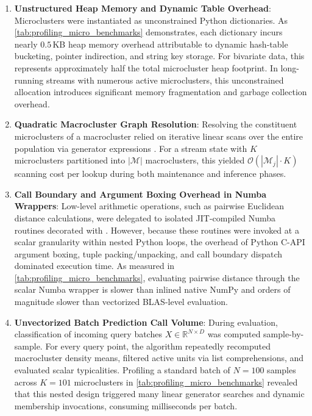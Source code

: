 \begin{enumerate}
    \item \textbf{Unstructured Heap Memory and Dynamic Table Overhead}: Microclusters were instantiated as unconstrained Python dictionaries. As \cref{tab:profiling_micro_benchmarks} demonstrates, each dictionary incurs nearly $0.5$\,KB heap memory overhead attributable to dynamic hash-table bucketing, pointer indirection, and string key storage. For bivariate data, this represents approximately half the total microcluster heap footprint. In long-running streams with numerous active microclusters, this unconstrained allocation introduces significant memory fragmentation and garbage collection overhead.

    \item \textbf{Quadratic Macrocluster Graph Resolution}: Resolving the constituent microclusters of a macrocluster relied on iterative linear scans over the entire population via generator expressions . For a stream state with $K$ microclusters partitioned into $|\mathcal{M}|$ macroclusters, this yielded $\mathcal{O}(|\mathcal{M}_j| \cdot K)$ scanning cost per lookup during both maintenance and inference phases.

    \item \textbf{Call Boundary and Argument Boxing Overhead in Numba Wrappers}: Low-level arithmetic operations, such as pairwise Euclidean distance calculations, were delegated to isolated JIT-compiled Numba routines decorated with . However, because these routines were invoked at a scalar granularity within nested Python loops, the overhead of Python C-API argument boxing, tuple packing/unpacking, and call boundary dispatch dominated execution time. As measured in \cref{tab:profiling_micro_benchmarks}, evaluating pairwise distance through the scalar Numba wrapper is slower than inlined native NumPy and orders of magnitude slower than vectorized BLAS-level evaluation.

    \item \textbf{Unvectorized Batch Prediction Call Volume}: During evaluation, classification of incoming query batches $X \in \mathbb{R}^{N \times D}$ was computed sample-by-sample. For every query point, the algorithm repeatedly recomputed macrocluster density means, filtered active units via list comprehensions, and evaluated scalar typicalities. Profiling a standard batch of $N = 100$ samples across $K = 101$ microclusters in \cref{tab:profiling_micro_benchmarks} revealed that this nested design triggered many linear generator searches and dynamic membership invocations, consuming milliseconds per batch.
\end{enumerate}

